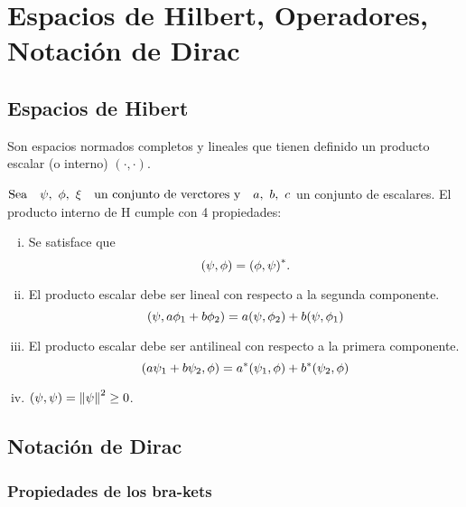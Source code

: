 \section{Espacios de Hilbert, Operadores, Notación de Dirac}

\subsection{Espacios de Hibert}

\begin{definition}
    Son espacios normados completos y lineales que tienen definido un producto escalar (o interno) $(\cdot,\cdot)$.
\end{definition}

$\qq*{Sea}\psi,~\phi,~\xi\qq{un conjunto de verctores y}a,~b,~c$ un conjunto de escalares. El producto interno de H cumple con 4 propiedades:

\begin{enumerate}[i.]
    \item Se satisface que
    \[  
        \qty(\psi,\phi)=\qty(\phi,\psi)^*.
    \]
    \item El producto escalar debe ser lineal con respecto a la segunda componente. 
    \[  
        \qty(\psi,a\phi_1+b\phi_2)=a\qty(\psi,\phi_2)+b\qty(\psi,\phi_1)
    \]
    \item El producto escalar debe ser antilineal con respecto a la primera componente. 
    \[  
        \qty(a\psi_1+b\psi_2,\phi)=a^*\qty(\psi_1,\phi)+b^*\qty(\psi_2,\phi)
    \]
    \item $\qty(\psi,\psi)=\norm{\psi}^2\geq 0$.
\end{enumerate}


\begin{recordar}
    
\end{recordar}

\begin{example}
\end{example}


\subsection{Notación de Dirac}
\subsubsection{Propiedades de los bra-kets}

